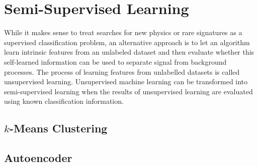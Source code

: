 \section{Semi-Supervised Learning}
\label{sec:semisupervised}
While it makes sense to treat searches for new physics or rare signatures as a supervised classification problem, an alternative approach is to let an algorithm learn intrinsic features from an unlabeled dataset and then evaluate whether this self-learned information can be used to separate signal from background processes. The process of learning features from unlabelled datasets is called unsupervised learning. Unsupervised machine learning can be transformed into semi-supervised learning when the results of unsupervised learning are evaluated using known classification information.

\subsection{$k$-Means Clustering}


\subsection{Autoencoder}


